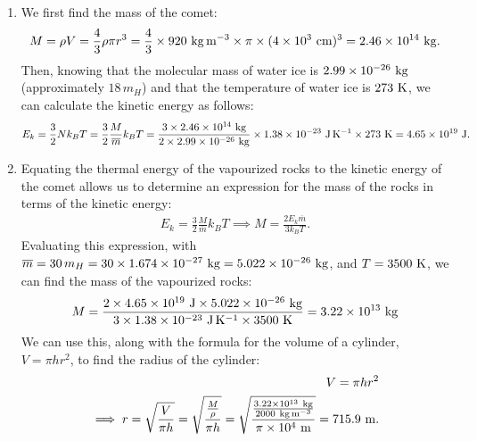 \documentclass[11pt,letterpaper]{article}
\begin{document}
\begin{enumerate}[label=(\alph*)]
    \item We first find the mass of the comet:
        \begin{align*}
            M = \rho V = \frac{4}{3}\rho \pi r^3 = \frac{4}{3}\times 920~{\rm kg\,m^{-3}}\times \pi \times (4\times 10^{3}~{\rm cm})^3 = 2.46\times 10^{14}~{\rm kg}.
        \end{align*}
        Then, knowing that the molecular mass of water ice is $2.99\times 10^{-26}~{\rm kg}$ (approximately $18\,m_H$) and that the temperature of water ice is $273~{\rm K}$, we can calculate the kinetic energy as follows:
        \begin{align*}
            E_k = \frac{3}{2}Nk_BT = \frac{3}{2}\frac{M}{\overline m}k_BT = \frac{3\times 2.46\times 10^{14}~{\rm kg}}{2\times 2.99\times 10^{-26}~{\rm kg}}\times 1.38\times 10^{-23}~{\rm J\,K^{-1}} \times 273~{\rm K} = 4.65\times 10^{19}~{\rm J}.
        \end{align*}
    \item Equating the thermal energy of the vapourized rocks to the kinetic energy of the comet allows us to determine an expression for the mass of the rocks in terms of the kinetic energy:
        \begin{align*}
            E_k = \frac{3}{2}\frac{M}{\overline m}k_BT
            \implies M = \frac{2E_k\overline{m}}{3k_BT}.
        \end{align*}
        Evaluating this expression, with $\overline{m} = 30\,m_H = 30\times 1.674\times 10^{-27}~{\rm kg} = 5.022\times 10^{-26}~{\rm kg}$, and $T = 3500~{\rm K}$, we can find the mass of the vapourized rocks:
        \begin{align*}
            M = \frac{2\times 4.65\times 10^{19}~{\rm J}\times 5.022\times 10^{-26}~{\rm kg}}{3\times 1.38\times 10^{-23}~{\rm J\,K^{-1}}\times 3500~{\rm K}} = 3.22\times 10^{13}~{\rm kg}
        \end{align*}
        We can use this, along with the formula for the volume of a cylinder, $V = \pi hr^2$, to find the radius of the cylinder:
        \begin{align*}
            V = \pi hr^2 \\
            \implies r = \sqrt{\frac{V}{\pi h}} = \sqrt{\frac{\frac{M}{\rho}}{\pi h}} = \sqrt{\frac{\frac{3.22\times 10^{13}~{\rm kg}}{2000~{\rm kg\,m^{-3}}}}{\pi \times 10^{4}~{\rm m}}} = 715.9~{\rm m}.
        \end{align*}


\end{enumerate}
\end{document}
